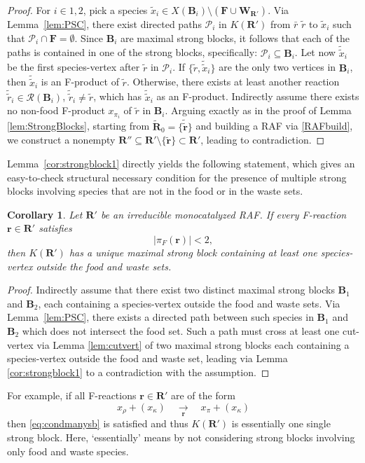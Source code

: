 \documentclass[pdflatex]{sn-jnl}
\theoremstyle{thmstyleone}%
\newtheorem{corollary}[theorem]{Corollary}%
\theoremstyle{examplesty}%
\theoremstyle{thmstylethree}%
\newcommand{\food}{\ensuremath{\mathbf{F}}}
\newcommand{\fr}[0]{\mathbf{r}}
\newcommand{\RAF}[0]{\mathbf{R}'}
\newcommand{\block}[0]{\mathbf{B}}
\newcommand{\fproducts}{\pi_F}
\begin{document}
\begin{proof}
For $i\in{1,2}$, pick a species $\tilde{x}_i\in X(\block_i)\setminus(\food\cup\mathbf{W}_{\RAF})$. 
Via Lemma~\ref{lem:PSC}, there exist directed paths $\mathcal{P}_i$ in $K(\RAF)$ from $\bar r$ 
$\tilde{r}$ to $\tilde{x}_i$ such that $\mathcal{P}_i\cap\food=\emptyset$. 
Since $\block_i$ are maximal strong blocks, it follows that each of the paths is contained in one of the strong blocks, 
specifically:  $\mathcal{P}_i\subseteq\block_i$. Let now $\tilde{\tilde{x}}_{i}$ be the first 
species-vertex after $\tilde r$ in $\mathcal{P}_i$. If $\{\tilde{r}, \tilde{\tilde{x}}_i\}$ 
are the only two vertices in $\block_i$, then $\tilde{\tilde{x}}_i$ is an F-product 
of $\tilde{r}$. Otherwise, there exists at least another reaction $\tilde{\tilde{r}}_i\in \mathcal{R}(\block_i)$, 
$\tilde{\tilde{r}}_i\neq \tilde{r}$, which has $\tilde{\tilde{x}}_i$ as an F-product. Indirectly assume there exists no 
non-food F-product $x_{\pi_i}$ of $\tilde{r}$ in $\block_i$. Arguing exactly as in the proof of Lemma \ref{lem:StrongBlocks}, starting from
$\tilde{\mathbf{R}}_0=\{\tilde{\tilde{\fr}}\}$ and building a RAF via \eqref{RAFbuild}, we construct a nonempty 
$\RAF'\subseteq \RAF\setminus \{\tilde{\fr}\}\subset \RAF$, leading to contradiction.   
\end{proof}

Lemma~\ref{cor:strongblock1} directly yields the following statement,
which gives an easy-to-check structural necessary condition for the
presence of multiple strong blocks involving species that are not in the
food or in the waste sets.  \vspace{6pt}
\begin{corollary}\label{cor:strongblock2}
  Let $\RAF$ be an irreducible monocatalyzed RAF. If every F-reaction
  $\fr\in\RAF$ satisfies
  \begin{equation}\label{eq:condmanysb}
    |\fproducts(\fr)|<2,
  \end{equation}
  then $K(\RAF)$ has a unique maximal strong block containing at least one
  species-vertex outside the food and waste sets.
\end{corollary}
\begin{proof}
Indirectly assume that there exist two distinct maximal strong blocks 
$\block_1$ and $\block_2$, each containing a species-vertex outside the food 
and waste sets. Via Lemma~\ref{lem:PSC}, there exists a directed path between 
such species in $\block_1$ and $\block_2$ which does not intersect the food set. 
Such a path must cross at least one cut-vertex via Lemma \ref{lem:cutvert} 
of two maximal strong blocks each containing a species-vertex 
outside the food and waste set, leading via Lemma \ref{cor:strongblock1} to a 
contradiction with the assumption.
\end{proof}
For example, if all F-reactions $\fr\in\RAF$ are of the form
\begin{equation*} 
  x_\rho + (x_\kappa)\quad\underset{\fr}{\longrightarrow}\quad
  x_\pi + (x_\kappa)
\end{equation*}
then \eqref{eq:condmanysb} is satisfied and thus $K(\RAF)$ is essentially
one single strong block. Here, `essentially' means by not
considering strong blocks involving only food and waste species.
\end{document}
